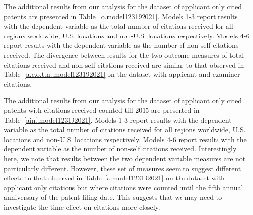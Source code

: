 \documentclass[12pt,letterpaper]{article}
\begin{document}
The additional results from our analysis for the dataset of applicant only cited patents are presented in Table~\ref{o.model123192021}. Models 1-3 report results with the dependent variable as the total number of citations received for all regions worldwide, U.S. locations and non-U.S. locations respectively. Models 4-6 report results with the dependent variable as the number of non-self citations received. The divergence between results for the two outcome measures of total citations received and non-self citations received are similar to that observed in Table~\ref{a.e.o.t.n..model123192021} on the dataset with applicant and examiner citations. \par





The additional results from our analysis for the dataset of applicant only cited patents with citations received counted till 2015 are presented in Table~\ref{ainf.model123192021}. Models 1-3 report results with the dependent variable as the total number of citations received for all regions worldwide, U.S. locations and non-U.S. locations respectively. Models 4-6 report results with the dependent variable as the number of non-self citations received. Interestingly here, we note that results between the two dependent variable measures are not particularly different. However, these set of measures seem to suggest different effects to that observed in Table~\ref{a.model123192021} on the dataset with applicant only citations but where citations were counted until the fifth annual anniversary of the patent filing date. This suggests that we may need to investigate the time effect on citations more closely. \par
\end{document}
